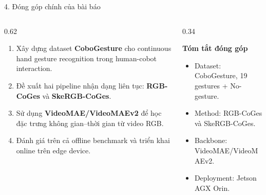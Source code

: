 \documentclass[aspectratio=169,9pt]{beamer}
\newcommand{\heading}[1]{{\bfseries #1\par}}
\newcommand{\tightitems}{\setlength{\itemsep}{0.12em}\setlength{\parskip}{0pt}\setlength{\parsep}{0pt}}
\begin{document}
\begin{frame}{4. Đóng góp chính của bài báo}
  \vspace{0.05cm}
  \begin{columns}[T,onlytextwidth]
    \begin{column}{0.62\textwidth}
      \begin{enumerate}\tightitems
        \item Xây dựng dataset \textbf{CoboGesture} cho continuous hand gesture recognition trong human-cobot interaction.
        \item Đề xuất hai pipeline nhận dạng liên tục: \textbf{RGB-CoGes} và \textbf{SkeRGB-CoGes}.
        \item Sử dụng \textbf{VideoMAE/VideoMAEv2} để học đặc trưng không gian--thời gian từ video RGB.
        \item Đánh giá trên cả offline benchmark và triển khai online trên edge device.
      \end{enumerate}
    \end{column}
    \begin{column}{0.34\textwidth}
      \heading{Tóm tắt đóng góp}
      \begin{itemize}\tightitems
        \item Dataset: CoboGesture, 19 gestures + No-gesture.
        \item Method: RGB-CoGes và SkeRGB-CoGes.
        \item Backbone: VideoMAE/VideoMAEv2.
        \item Deployment: Jetson AGX Orin.
      \end{itemize}
    \end{column}
  \end{columns}
\end{frame}
\end{document}
